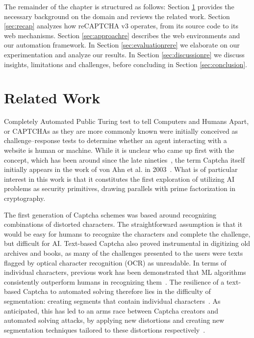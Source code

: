 The remainder of the chapter is structured as follows:
Section \ref{sec:related} provides the necessary background on the domain and reviews the related work.
Section \ref{sec:recap} analyzes how reCAPTCHA v3 operates, from its source code to its web mechanisms.
Section \ref{sec:approachre} describes the web environments and our automation framework.
In Section \ref{sec:evaluationrere} we elaborate on our experimentation and analyze our results.
In Section \ref{sec:discussionre} we discuss insights, limitations and challenges, before concluding in Section \ref{sec:conclusion}.

\section{Related Work}
\label{sec:related}

Completely Automated Public Turing test to tell Computers and Humans Apart, or CAPTCHAs as they are more commonly known were initially conceived as challenge–response tests to determine whether an agent interacting with a website is human or machine.
While it is unclear who came up first with the concept, which has been around since the late nineties~\cite{naor1996verification}, the term Captcha itself initially appears in the work of von Ahn et al. in 2003~\cite{von2003captcha}.
What is of particular interest in this work is that it constitutes the first exploration of utilizing AI problems as security primitives, drawing parallels with prime factorization in cryptography.

The first generation of Captcha schemes was based around recognizing combinations of distorted characters.
The straightforward assumption is that it would be easy for humans to recognize the characters and complete the challenge, but difficult for AI.
Text-based Captcha also proved instrumental in digitizing old archives and books, as many of the challenges presented to the users were texts flagged by optical character recognition (\gls{OCR}) as unreadable.
In terms of individual characters, previous work has been demonstrated that \gls{ML} algorithms consistently outperform humans in recognizing them~\cite{chellapilla2005computers}.
The resilience of a text-based Captcha to automated solving therefore lies in the difficulty of segmentation: creating segments that contain individual characters~\cite{bursztein2014end}.
As anticipated, this has led to an arms race between Captcha creators and automated solving attacks, by applying new distortions and creating new segmentation techniques tailored to these distortions respectively~\cite{cruz2012breaking}.

